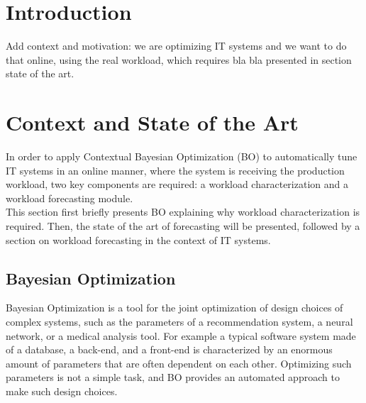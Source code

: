 \documentclass[a4paper]{article} %
\begin{document}
	\section{ Introduction }
	Add context and motivation: we are optimizing IT systems and we want to do that online, using the real workload, which requires bla bla presented in section state of the art.
	
	\section{ Context and State of the Art }
	In order to apply Contextual Bayesian Optimization (BO) to automatically tune IT systems in an online manner, where the system is receiving the production workload, two key components are required: a workload characterization and a workload forecasting module. \\
	This section first briefly presents BO explaining why workload characterization is required. Then, the state of the art of forecasting will be presented, followed by a section on workload forecasting in the context of IT systems. 
	
	\subsection{ Bayesian Optimization }
	Bayesian Optimization \cite{BO} is a tool for the joint optimization of design choices of complex systems, such as the parameters of a recommendation system, a neural network, or a medical analysis tool. For example a typical software system made of a database, a back-end, and a front-end is characterized by an enormous amount of parameters that are often dependent on each other.
	Optimizing such parameters is not a simple task, and BO provides an automated approach to make such design choices.\\
	
\end{document}
